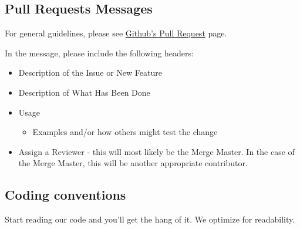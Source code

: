 \documentclass[
  letterpaper,
  DIV=11,
  numbers=noendperiod]{scrreprt}
\providecommand{\tightlist}{%
  \setlength{\itemsep}{0pt}\setlength{\parskip}{0pt}}\usepackage{longtable,booktabs,array}
\begin{document}
\subsection{Pull Requests Messages}\label{pull-requests-messages}

For general guidelines, please see
\href{https://docs.github.com/en/pull-requests/collaborating-with-pull-requests/proposing-changes-to-your-work-with-pull-requests/creating-a-pull-request}{Github's
Pull Request} page.

In the message, please include the following headers:

\begin{itemize}
\tightlist
\item
  Description of the Issue or New Feature
\item
  Description of What Has Been Done
\item
  Usage

  \begin{itemize}
  \tightlist
  \item
    Examples and/or how others might test the change
  \end{itemize}
\item
  Assign a Reviewer - this will most likely be the Merge Master. In the
  case of the Merge Master, this will be another appropriate
  contributor.
\end{itemize}

\subsection{Coding conventions}\label{coding-conventions}

Start reading our code and you'll get the hang of it. We optimize for
readability.
\end{document}
